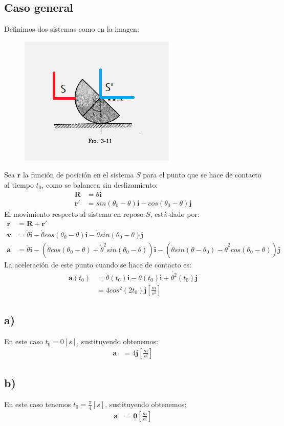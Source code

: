 \documentclass{article}
\begin{document}
\begin{tcolorbox}[breakable]
    \subsection*{Caso general}
    Definimos dos sistemas como en la imagen:
    \begin{figure}[H]
        \centering 
        \includegraphics[trim=20 20 20 20, clip]{p5_cylinder.png}
    \end{figure}
    Sea $\bm{r}$ la función de posición en el sistema $S$ para el punto que se hace de contacto al tiempo $t_0$,
    como se balancea sin deslizamiento:
    \begin{align*}
        \bm{R} &= \theta \bm{i} \\
        \bm{r'} &= sin(\theta_0-\theta)\bm{i} - cos(\theta_0-\theta)\bm{j}
    \end{align*}
    El movimiento respecto al sistema en reposo $S$, está dado por:
    \begin{align*}
        \bm{r} &= \bm{R} + \bm{r'} \\
        \bm{v} &=\dot{\theta}\bm{i} 
        - \dot{\theta}cos(\theta_0-\theta)\bm{i} 
        - \dot{\theta}sin(\theta_0-\theta)\bm{j} \\ 
        \bm{a} 
        &=\ddot{\theta}\bm{i} 
        -(\ddot{\theta}cos(\theta_0-\theta) + \dot{\theta}^2sin(\theta_0-\theta))\bm{i} 
        -(\ddot{\theta}sin(\theta-\theta_0) - \dot{\theta}^2cos(\theta_0-\theta))\bm{j}  
    \end{align*}
    La aceleración de este punto cuando se hace de contacto es:
    \begin{align*}
        \bm{a}(t_0) 
        &= \ddot{\theta}(t_0)\bm{i} - \ddot{\theta}(t_0)\bm{i} + \dot{\theta^2}(t_0)\bm{j} \\
        &= 4cos^2(2t_0)\bm{j} \left[ \frac{m}{s^2} \right]
    \end{align*}
    \subsection*{a)}
    En este caso $t_0 = 0[s]$, sustituyendo obtenemos:
    \begin{align*}
        \bm{a} &= 4\bm{j} \left[ \frac{m}{s^2} \right]
    \end{align*}
    \subsection*{b)}
    En este caso tenemos $t_0 = \frac{\pi}{4}[s]$, sustituyendo obtenemos:
    \begin{align*}
        \bm{a} &= \bm{0} \left[ \frac{m}{s^2} \right]
    \end{align*}
\end{tcolorbox}
\end{document}
